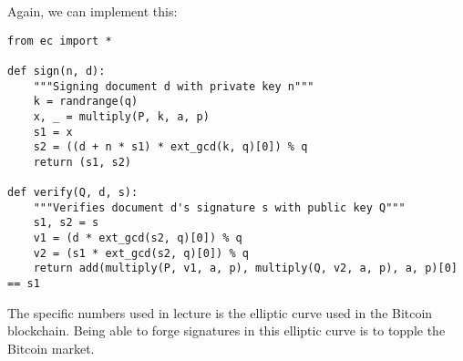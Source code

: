 Again, we can implement this: 
\begin{lstlisting}
from ec import *

def sign(n, d):
    """Signing document d with private key n"""
    k = randrange(q)
    x, _ = multiply(P, k, a, p)
    s1 = x
    s2 = ((d + n * s1) * ext_gcd(k, q)[0]) % q
    return (s1, s2)

def verify(Q, d, s):
    """Verifies document d's signature s with public key Q"""
    s1, s2 = s
    v1 = (d * ext_gcd(s2, q)[0]) % q
    v2 = (s1 * ext_gcd(s2, q)[0]) % q
    return add(multiply(P, v1, a, p), multiply(Q, v2, a, p), a, p)[0] == s1
\end{lstlisting}

\begin{remark}
    The specific numbers used in lecture is the elliptic curve used in the Bitcoin blockchain. Being able to forge signatures in this elliptic curve is to topple the Bitcoin market. 
\end{remark}